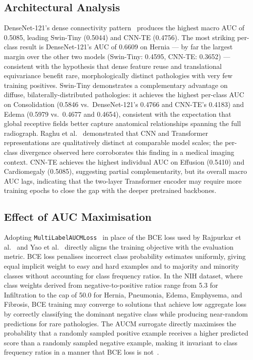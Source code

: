 \documentclass[conference]{IEEEtran}
\begin{document}
\subsection{Architectural Analysis}

DenseNet-121's dense connectivity pattern~\cite{huang2017} produces
the highest macro AUC of 0.5085, leading Swin-Tiny (0.5044) and
CNN-TE (0.4756). The most striking per-class result is DenseNet-121's
AUC of 0.6609 on Hernia --- by far the largest margin over the other
two models (Swin-Tiny: 0.4595, CNN-TE: 0.3652) --- consistent with
the hypothesis that dense feature reuse and translational equivariance
benefit rare, morphologically distinct pathologies with very few
training positives. Swin-Tiny demonstrates a complementary advantage
on diffuse, bilaterally-distributed pathologies: it achieves the
highest per-class AUC on Consolidation (0.5846 vs.\ DenseNet-121's
0.4766 and CNN-TE's 0.4183) and Edema (0.5979 vs.\ 0.4677 and 0.4654),
consistent with the expectation that global receptive fields better
capture anatomical relationships spanning the full radiograph.
Raghu et al.~\cite{raghu2021} demonstrated that CNN and Transformer
representations are qualitatively distinct at comparable model scales;
the per-class divergence observed here corroborates this finding in
a medical imaging context. CNN-TE achieves the highest individual AUC
on Effusion (0.5410) and Cardiomegaly (0.5085), suggesting partial
complementarity, but its overall macro AUC lags, indicating that the
two-layer Transformer encoder may require more training epochs to
close the gap with the deeper pretrained backbones.

\subsection{Effect of AUC Maximisation}

Adopting \texttt{MultiLabelAUCMLoss}~\cite{yuan2021} in place of the
BCE loss used by Rajpurkar et al.~\cite{rajpurkar2017} and Yao
et al.~\cite{yao2018} directly aligns the training objective with the
evaluation metric. BCE loss penalises incorrect class probability
estimates uniformly, giving equal implicit weight to easy and hard
examples and to majority and minority classes without accounting for
class frequency ratios. In the NIH dataset, where class weights derived
from negative-to-positive ratios range from 5.3 for Infiltration to the
cap of 50.0 for Hernia, Pneumonia, Edema, Emphysema, and Fibrosis, BCE
training may converge to solutions that achieve low aggregate loss by
correctly classifying the dominant negative class while producing
near-random predictions for rare pathologies. The AUCM surrogate
directly maximises the probability that a randomly sampled positive
example receives a higher predicted score than a randomly sampled
negative example, making it invariant to class frequency ratios in a
manner that BCE loss is not~\cite{yuan2021}.
\end{document}
